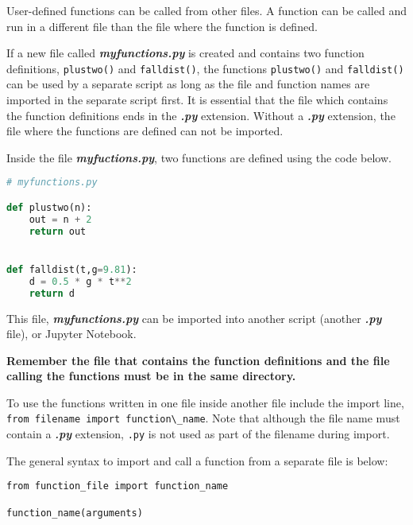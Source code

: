 \documentclass{book}
\newcommand{\passthrough}[1]{#1}
\begin{document}
    
        User-defined functions can be called from other files. A function can be
called and run in a different file than the file where the function is
defined.

If a new file called \textbf{\emph{myfunctions.py}} is created and
contains two function definitions, \passthrough{\lstinline!plustwo()!}
and \passthrough{\lstinline!falldist()!}, the functions
\passthrough{\lstinline!plustwo()!} and
\passthrough{\lstinline!falldist()!} can be used by a separate script as
long as the file and function names are imported in the separate script
first. It is essential that the file which contains the function
definitions ends in the \textbf{\emph{.py}} extension. Without a
\textbf{\emph{.py}} extension, the file where the functions are defined
can not be imported.
    




    
        Inside the file \textbf{\emph{myfuctions.py}}, two functions are defined
using the code below.

\begin{lstlisting}[language=Python]
# myfunctions.py

def plustwo(n):
    out = n + 2
    return out


def falldist(t,g=9.81):
    d = 0.5 * g * t**2
    return d
\end{lstlisting}
    




    
        This file, \textbf{\emph{myfunctions.py}} can be imported into another
script (another \textbf{\emph{.py}} file), or Jupyter Notebook.

\textbf{Remember the file that contains the function definitions and the
file calling the functions must be in the same directory.}

To use the functions written in one file inside another file include the
import line,
\passthrough{\lstinline!from filename import function\_name!}. Note that
although the file name must contain a \textbf{\emph{.py}} extension,
\passthrough{\lstinline!.py!} is not used as part of the filename during
import.

The general syntax to import and call a function from a separate file is
below:

\begin{lstlisting}
from function_file import function_name

function_name(arguments)
\end{lstlisting}
\end{document}
